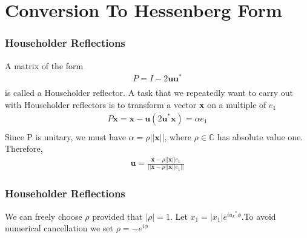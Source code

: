 \documentclass{beamer}
\theoremstyle{remark}
\numberwithin{equation}{section}
\begin{document}
\section{Conversion To Hessenberg Form}
\begin{frame}
\frametitle{Householder Reflections}
A matrix of the form
\begin{align}
    P = I - 2\textbf{uu}^*\\
\end{align}
is called a Householder reflector.
A task that we repeatedly want to carry out with Householder reflectors is to transform
a vector \textbf{x} on a multiple of \textbf{$e_1$}
\begin{align}
    P\textbf{x} = \textbf{x} - \textbf{u}(2\textbf{u}^*\textbf{x}) = \alpha \textbf{$e_1$}\\
\end{align}
Since P is unitary, we must have $\alpha = \rho 
||\textbf{x}||$, where $\rho \in \mathbb{C}$ has absolute value one. Therefore,
\begin{align}
    \textbf{u} = \frac{\textbf{x} - \rho||\textbf{x}||\textbf{$e_1$}}{||\textbf{x} - \rho||\textbf{x}||\textbf{$e_1$}||}
\end{align}
\end{frame}
\begin{frame}
\frametitle{Householder Reflections}
We can freely choose $\rho$ provided that $|\rho| = 1$. Let $x_1 = |x_1|e^{i\textbf{$u_k$}^*\phi}$.To avoid numerical cancellation we set $\rho = -e^{i\phi}$
\end{frame}
\end{document}
